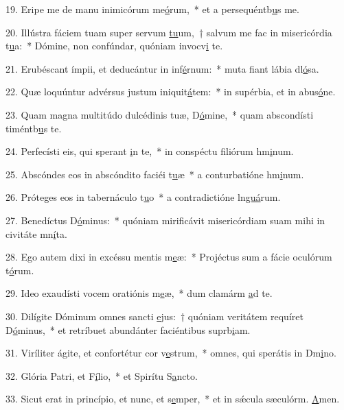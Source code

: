 19. Eripe me de manu inimicórum me\uline{ó}rum,~* et a persequéntb\uline{u}s me.\par 
20. Illústra fáciem tuam super servum \uline{tu}um,~† salvum me fac in misericórdia t\uline{u}a:~* Dómine, non confúndar, quóniam invocv\uline{i} te.\par 
21. Erubéscant ímpii, et deducántur in inf\uline{é}rnum:~* muta fiant lábia dl\uline{ó}sa.\par 
22. Quæ loquúntur advérsus justum iniquit\uline{á}tem:~* in supérbia, et in abus\uline{ó}ne.\par 
23. Quam magna multitúdo dulcédinis tuæ, D\uline{ó}mine,~* quam abscondísti timéntb\uline{u}s te.\par 
24. Perfecísti eis, qui sperant \uline{i}n te,~* in conspéctu filiórum hm\uline{i}num.\par 
25. Abscóndes eos in abscóndito faciéi t\uline{u}æ~* a conturbatióne hm\uline{i}num.\par 
26. Próteges eos in tabernáculo t\uline{u}o~* a contradictióne ln\uline{guá}rum.\par 
27. Benedíctus D\uline{ó}minus:~* quóniam mirificávit misericórdiam suam mihi in civitáte mn\uline{í}ta.\par 
28. Ego autem dixi in excéssu mentis m\uline{e}æ:~* Projéctus sum a fácie oculórum t\uline{ó}rum.\par 
29. Ideo exaudísti vocem oratiónis m\uline{e}æ,~* dum clamárm \uline{a}d te.\par 
30. Dilígite Dóminum omnes sancti \uline{e}jus:~† quóniam veritátem requíret D\uline{ó}minus,~* et retríbuet abundánter faciéntibus suprb\uline{i}am.\par 
31. Viríliter ágite, et confortétur cor v\uline{e}strum,~* omnes, qui sperátis in Dm\uline{i}no.\par 
32. Glória Patri, et F\uline{í}lio,~* et Spirítu S\uline{a}ncto.\par 
33. Sicut erat in princípio, et nunc, et s\uline{e}mper,~* et in sǽcula sæculórm. \uline{A}men.\par 
